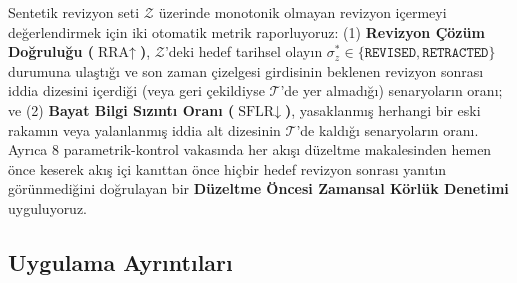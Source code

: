 ﻿\documentclass[journal]{IEEEtran}
\begin{document}
Sentetik revizyon seti $\mathcal{Z}$ \"{u}zerinde monotonik olmayan revizyon i\c{c}ermeyi de\u{g}erlendirmek i\c{c}in iki otomatik metrik raporluyoruz: (1) \textbf{Revizyon \c{C}\"{o}z\"{u}m Do\u{g}rulu\u{g}u ($\text{RRA} \uparrow$)}, $\mathcal{Z}$'deki hedef tarihsel olay{\i}n $\sigma_z^* \in \{\texttt{REVISED}, \texttt{RETRACTED}\}$ durumuna ula\c{s}t{\i}\u{g}{\i} ve son zaman \c{c}izelgesi girdisinin beklenen revizyon sonras{\i} iddia dizesini i\c{c}erdi\u{g}i (veya geri \c{c}ekildiyse $\mathcal{T}$'de yer almad{\i}\u{g}{\i}) senaryolar{\i}n oran{\i}; ve (2) \textbf{Bayat Bilgi S{\i}z{\i}nt{\i} Oran{\i} ($\text{SFLR} \downarrow$)}, yasaklanm{\i}\c{s} herhangi bir eski rakam{\i}n veya yalanlanm{\i}\c{s} iddia alt dizesinin $\mathcal{T}$'de kald{\i}\u{g}{\i} senaryolar{\i}n oran{\i}. Ayr{\i}ca $8$ parametrik-kontrol vakas{\i}nda her ak{\i}\c{s}{\i} d\"{u}zeltme makalesinden hemen \"{o}nce keserek ak{\i}\c{s} i\c{c}i kan{\i}ttan \"{o}nce hi\c{c}bir hedef revizyon sonras{\i} yan{\i}t{\i}n g\"{o}r\"{u}nmedi\u{g}ini do\u{g}rulayan bir \textbf{D\"{u}zeltme \"{O}ncesi Zamansal K\"{o}rl\"{u}k Denetimi} uyguluyoruz.

\subsection{Uygulama Ayr{\i}nt{\i}lar{\i}}
\label{subsec:implementation}
\end{document}
